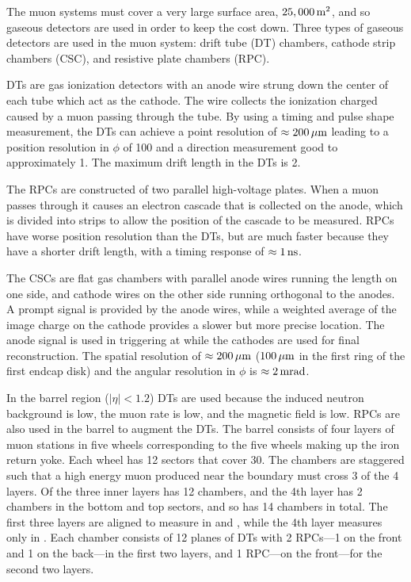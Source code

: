 The muon systems must cover a very large surface area, $25,000\text{\,m}^{2}$, and
so gaseous detectors are used in order to keep the cost down. Three types of
gaseous detectors are used in the muon system: drift tube (DT) chambers,
cathode strip chambers (CSC), and resistive plate chambers (RPC).

DTs are gas ionization detectors with an anode wire strung down the center of
each tube which act as the cathode. The wire collects the ionization charged
caused by a muon passing through the tube. By using a timing and pulse shape
measurement, the DTs can achieve a point resolution of $\approx
200\text{\,$\mu$m}$ leading to a position resolution in $\phi$ of 100\micrometers
and a direction measurement good to approximately 1\millirads. The maximum
drift length in the DTs is 2\centimeters.

The RPCs are constructed of two parallel high-voltage plates. When a muon
passes through it causes an electron cascade that is collected on the anode,
which is divided into strips to allow the position of the cascade to be
measured. RPCs have worse position resolution than the DTs, but are much
faster because they have a shorter drift length, with a timing response of
$\approx 1\text{\,ns}$.

The CSCs are flat gas chambers with parallel anode wires running the length on
one side, and cathode wires on the other side running orthogonal to the anodes.
A prompt signal is provided by the anode wires, while a weighted average of the
image charge on the cathode provides a slower but more precise location. The
anode signal is used in triggering at \Lone while the cathodes are used for
final reconstruction. The spatial resolution of $\approx 200\text{\,$\mu$m}$
($100\text{\,$\mu$m}$ in the first ring of the first endcap disk) and the angular
resolution in $\phi$ is $\approx 2\text{\,mrad}$.

In the barrel region ($|\eta| < 1.2$) DTs are used because the induced neutron
background is low, the muon rate is low, and the magnetic field is low. RPCs
are also used in the barrel to augment the DTs. The barrel consists of four
layers of muon stations in five wheels corresponding to the five wheels making
up the iron return yoke. Each wheel has 12 sectors that cover 30\degrees. The
chambers are staggered such that a high energy muon produced near the boundary
must cross 3 of the 4 layers. Of the three inner layers has 12 chambers, and
the 4th layer has 2 chambers in the bottom and top sectors, and so has 14
chambers in total. The first three layers are aligned to measure in \coordrphi
and \coordz, while the 4th layer measures only in \coordrphi. Each chamber
consists of 12 planes of DTs with 2 RPCs---1 on the front and 1 on the
back---in the first two layers, and 1 RPC---on the front---for the second two
layers.

